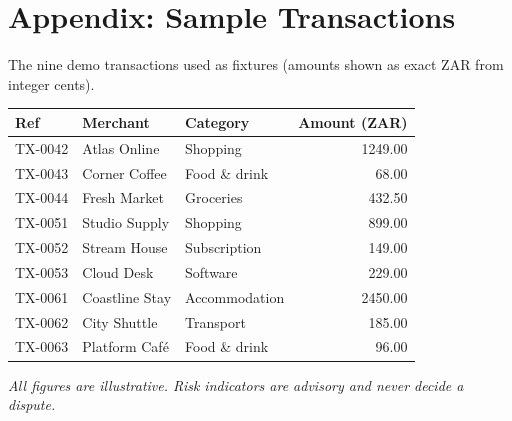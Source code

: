 \documentclass[11pt,a4paper]{article}
\begin{document}
\section*{Appendix: Sample Transactions}
\noindent The nine demo transactions used as fixtures (amounts shown as exact ZAR from integer cents).\par\vspace{0.4em}
\renewcommand{\arraystretch}{1.2}
\begin{longtable}{@{}lllr@{}}
\toprule
\textbf{Ref} & \textbf{Merchant} & \textbf{Category} & \textbf{Amount (ZAR)} \\
\midrule
\endhead
TX-0042 & Atlas Online & Shopping & 1249.00 \\
TX-0043 & Corner Coffee & Food \& drink & 68.00 \\
TX-0044 & Fresh Market & Groceries & 432.50 \\
TX-0051 & Studio Supply & Shopping & 899.00 \\
TX-0052 & Stream House & Subscription & 149.00 \\
TX-0053 & Cloud Desk & Software & 229.00 \\
TX-0061 & Coastline Stay & Accommodation & 2450.00 \\
TX-0062 & City Shuttle & Transport & 185.00 \\
TX-0063 & Platform Café & Food \& drink & 96.00 \\
\bottomrule
\end{longtable}

\vfill
\noindent\textit{All figures are illustrative. Risk indicators are advisory and never decide a dispute.}
\end{document}
